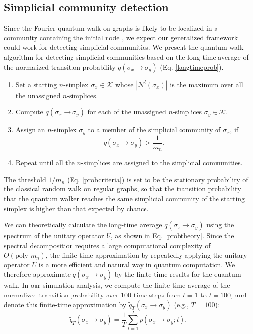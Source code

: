 \documentclass[10pt, letterpaper]{article}
\begin{document}
\subsection{Simplicial community detection}
Since the Fourier quantum walk on graphs is likely to be localized in a community containing the initial node \cite{Mukai2020}, we expect our generalized framework could work for detecting simplicial communities. We present the quantum walk algorithm for detecting simplicial communities based on the long-time average of the normalized transition probability $q(\sigma_x\to\sigma_y)$ (Eq. \ref{longtimeprob}).
\begin{enumerate}
\item Set a starting $n$-simplex $\sigma_x\in\mathcal{K}$ whose $\left|\mathcal{N}^{l}(\sigma_x)\right|$ is the maximum over all the unassigned $n$-simplices.
\item Compute $q(\sigma_x\to\sigma_y)$ for each of the unassigned $n$-simplices $\sigma_y\in\mathcal{K}$.
\item Assign an $n$-simplex $\sigma_y$ to a member of the simplicial community of $\sigma_x$, if
\begin{equation} \label{probcriteria}
q(\sigma_x\to\sigma_y)>\frac{1}{m_n}.
\end{equation}
\item Repeat until all the $n$-simplices are assigned to the simplicial communities.
\end{enumerate}
The threshold $1/{m_n}$ (Eq. \ref{probcriteria}) is set to be the stationary probability of the classical random walk on regular graphs, so that the transition probability that the quantum walker reaches the same simplicial community of the starting simplex is higher than that expected by chance.

We can theoretically calculate the long-time average $q(\sigma_x\to\sigma_y)$ using the spectrum of the unitary operator $U$, as shown in Eq. \ref{probtheory}. Since the spectral decomposition requires a large computational complexity of $O(\textrm{poly } m_n)$, the finite-time approximation by repeatedly applying the unitary operator $U$ is a more efficient and natural way in quantum computation. We therefore approximate $q(\sigma_x\to\sigma_y)$ by the finite-time results for the quantum walk. In our simulation analysis, we compute the finite-time average of the normalized transition probability over 100 time steps from $t=1$ to $t=100$, and denote this finite-time approximation by $\tilde{q}_{T}(\sigma_x\to\sigma_y)$ (e.g., $T=100$):
\begin{equation}
\tilde{q}_{T}(\sigma_x\to\sigma_y) = \frac{1}{T} \sum_{t=1}^{T} p(\sigma_x\to\sigma_y; t).
\end{equation}
\end{document}

